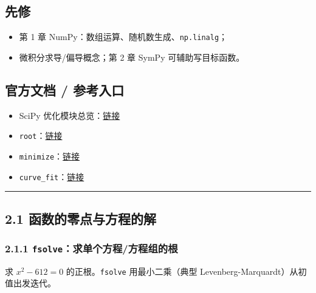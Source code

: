 \subsection{先修}\label{ux5148ux4fee-7}

\begin{itemize}
\tightlist
\item
  第 1 章 NumPy：数组运算、随机数生成、\texttt{np.linalg}；
\item
  微积分求导/偏导概念；第 2 章 SymPy 可辅助写目标函数。
\end{itemize}

\subsection{官方文档 /
参考入口}\label{ux5b98ux65b9ux6587ux6863-ux53c2ux8003ux5165ux53e3-1}

\begin{itemize}
\tightlist
\item
  SciPy
  优化模块总览：\href{https://docs.scipy.org/doc/scipy/reference/optimize.html}{链接}
\item
  \texttt{root}：\href{https://docs.scipy.org/doc/scipy/reference/generated/scipy.optimize.root.html}{链接}
\item
  \texttt{minimize}：\href{https://docs.scipy.org/doc/scipy/reference/generated/scipy.optimize.minimize.html}{链接}
\item
  \texttt{curve\_fit}：\href{https://docs.scipy.org/doc/scipy/reference/generated/scipy.optimize.curve_fit.html}{链接}
\end{itemize}

\begin{center}\rule{0.5\linewidth}{0.5pt}\end{center}

\subsection{2.1
函数的零点与方程的解}\label{ux51fdux6570ux7684ux96f6ux70b9ux4e0eux65b9ux7a0bux7684ux89e3}

\subsubsection{\texorpdfstring{2.1.1
\texttt{fsolve}：求单个方程/方程组的根}{2.1.1 fsolve：求单个方程/方程组的根}}\label{fsolveux6c42ux5355ux4e2aux65b9ux7a0bux65b9ux7a0bux7ec4ux7684ux6839}

求 \(x^2-612=0\) 的正根。\texttt{fsolve} 用最小二乘（典型
Levenberg-Marquardt）从初值出发迭代。

